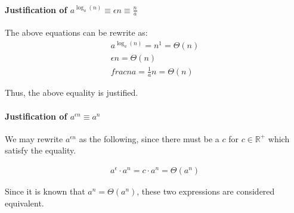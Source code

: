 \documentclass[12pt]{article}
\begin{document}
\paragraph{Justification of $a^{\log_a(n)} \equiv \epsilon n \equiv \frac{n}{a}$\newline}

The above equations can be rewrite as:
\begin{gather}
    a^{\log_a(n)} = n^1 = \Theta(n) \\
    \epsilon n = \Theta(n) \\
    frac{n}{a} = \frac{1}{a}n =  \Theta(n)
\end{gather}

Thus, the above equality is justified.

\paragraph{Justification of $a^{\epsilon n} \equiv a^n$\newline}

We may rewrite $a^{\epsilon n}$ as the following, since there must be a $c$ for $c \in \mathbb{R^+}$ which satisfy the equality.

\begin{gather}
    a^{\epsilon} \cdot a^n = c \cdot a^n = \Theta(a^n)
\end{gather}

Since it is known that $a^n = \Theta(a^n)$, these two expressions are considered equivalent.

%
% 
% 
\end{document}
